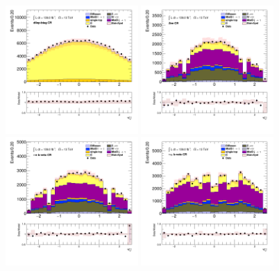 		\begin{figure}[!htp]
			\begin{center}    
			\includegraphics[width=0.45\textwidth]{chapters/chapter6_HPlus/images/taulep/lep_0_eta_DILEP_BTAG.png}
			\includegraphics[width=0.45\textwidth]{chapters/chapter6_HPlus/images/taulep/lep_0_eta_ZEE.png} \\
			\includegraphics[width=0.45\textwidth]{chapters/chapter6_HPlus/images/taulep/lep_0_eta_TAUEL_BVETO.png} 
			\includegraphics[width=0.45\textwidth]{chapters/chapter6_HPlus/images/taulep/lep_0_eta_TAUMU_BVETO.png} \\

\end{center}
\end{figure}
